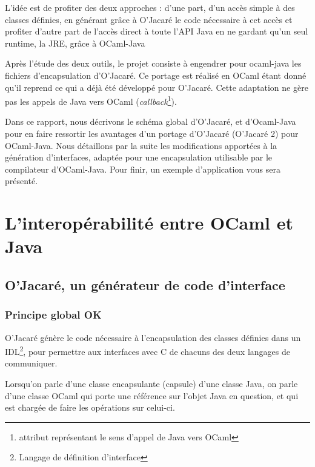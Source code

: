 \documentclass[a4paper, 11pt]{article}
\begin{document}
L'idée est de profiter des deux approches : d'une part, d'un accès simple à des classes
définies, en générant grâce à O'Jacaré le code nécessaire à cet accès 
et profiter d'autre part de l'accès direct à toute
l'API Java en ne gardant qu'un seul runtime, la
JRE, grâce à OCaml-Java

Après l’étude des deux outils, le projet consiste à engendrer pour
ocaml-java les fichiers d’encapsulation d'O’Jacaré. Ce
portage est réalisé en OCaml étant donné qu'il reprend ce qui
a déjà été développé pour O’Jacaré. Cette adaptation ne gère pas les appels de Java vers OCaml (\emph{callback}\footnote{attribut représentant le sens d'appel de Java vers OCaml}).
\newline

Dans ce rapport, nous décrivons le schéma global d'O'Jacaré, et d'Ocaml-Java
pour en faire ressortir les avantages d'un portage d'O'Jacaré (O'Jacaré 2) pour OCaml-Java.
Nous détaillons par la suite les modifications apportées à la
génération d'interfaces, adaptée pour une encapsulation utilisable par
le compilateur d'OCaml-Java.
Pour finir, un exemple d'application vous sera présenté.
\newpage









\section{L'interopérabilité entre OCaml et Java}


\subsection{O'Jacaré, un générateur de code d'interface}

\subsubsection{Principe global OK}
O'Jacaré génère le code nécessaire à l'encapsulation des classes
définies dans un IDL\footnote{Langage de définition d'interface}, pour permettre aux interfaces avec C de chacuns des deux langages de communiquer.

Lorsqu'on parle d'une classe encapsulante (capsule) d'une classe Java, 
on parle d'une classe OCaml qui porte une référence sur l'objet Java en question,
et qui est chargée de faire les opérations sur celui-ci.
\end{document}
